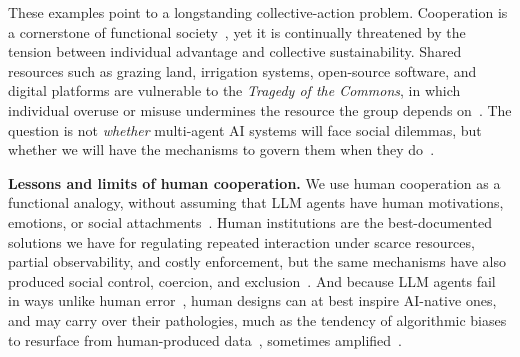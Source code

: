 \documentclass[runningheads]{llncs}
\begin{document}
These examples point to a longstanding collective-action problem. Cooperation is a cornerstone of functional society~\mbox{\citep{nowak2006five}}, yet it is continually threatened by the tension between individual advantage and collective sustainability. Shared resources such as grazing land, irrigation systems, open-source software, and digital platforms are vulnerable to the \emph{Tragedy of the Commons}, in which individual overuse or misuse undermines the resource the group depends on~\mbox{\citep{hardinTragedyCommons1968}}. The question is not \emph{whether} multi-agent AI systems will face social dilemmas, but whether we will have the mechanisms to govern them when they do~\mbox{\citep{piatti2024govsim,tewolde2026coopevalbenchmarkingcooperationsustainingmechanisms}}.

\textbf{Lessons and limits of human cooperation.}
We use human cooperation as a functional analogy, without assuming that LLM agents have human motivations, emotions, or social attachments~\mbox{\citep{anthis2025llmsocialsimulationspromising}}. Human institutions are the best-documented solutions we have for regulating repeated interaction under scarce resources, partial observability, and costly enforcement, but the same mechanisms have also produced social control, coercion, and exclusion~\mbox{\citep{gross2026hidden}}. And because LLM agents fail in ways unlike human error~\mbox{\citep{mccoyEmbersAutoregressionShow2024}}, human designs can at best inspire AI-native ones, and may carry over their pathologies, much as the tendency of algorithmic biases to resurface from human-produced data~\mbox{\citep{caliskan2017semantics}}, sometimes amplified~\mbox{\citep{zhao2017menshopping}}.
\end{document}
